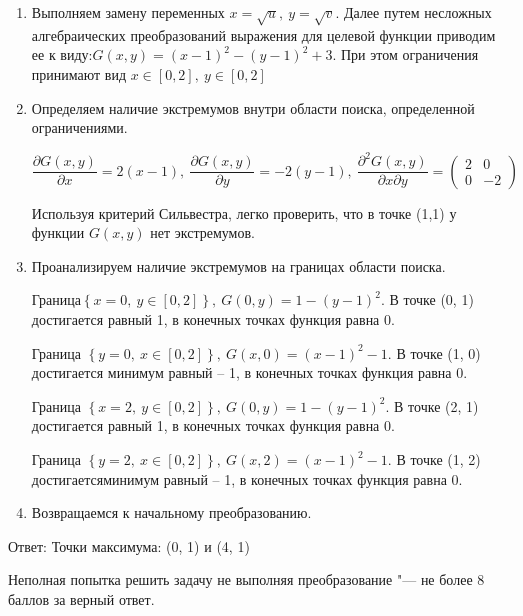 \documentclass[addpoints, answers]{exam} %
\begin{document}
\begin{questions}
\begin{solution}
  \begin{enumerate}
  \item  Выполняем замену переменных $x=\sqrt{u},\ y=\sqrt{v}$. Далее путем несложных алгебраических преобразований выражения для целевой функции приводим ее к виду:$G\left(x,y\right)={\left(x-1\right)}^2-{\left(y-1\right)}^2+3$. При этом ограничения принимают вид $x\in \left[0,2\right],\ y\in \left[0,2\right]$

  \item  Определяем наличие экстремумов внутри области поиска, определенной ограничениями.

  \[\frac{\partial G\left(x,y\right)}{\partial x}=2\left(x-1\right),\ \frac{\partial G\left(x,y\right)}{\partial y}=-2\left(y-1\right),\ \frac{{\partial }^2G\left(x,y\right)}{\partial x\partial y}=\left( \begin{array}{cc}
  2 & 0 \\
  0 & -2 \end{array}
  \right)\]


Используя критерий Сильвестра, легко проверить, что в точке (1,1) у функции $G(x,y)$ нет экстремумов.

\item  Проанализируем наличие экстремумов на границах области поиска.

Граница$\left\{x=0,\ y\in \left[0,2\right]\right\},\ G\left(0,y\right)=1-{\left(y-1\right)}^2$. В точке (0, 1) достигается \textbf{} равный 1, в конечных точках функция равна 0.

Граница $\left\{y=0,\ x\in \left[0,2\right]\right\},\ G\left(x,0\right)={\left(x-1\right)}^2-1$. В точке (1, 0) достигается минимум равный -- 1, в конечных точках функция равна 0.

Граница $\left\{x=2,\ y\in \left[0,2\right]\right\},\ G\left(0,y\right)=1-{\left(y-1\right)}^2$. В точке (2, 1) достигается \textbf{} равный 1, в конечных точках функция равна 0.

Граница $\left\{y=2,\ x\in \left[0,2\right]\right\},\ G\left(x,2\right)={\left(x-1\right)}^2-1$. В точке (1, 2) достигаетсяминимум равный -- 1, в конечных точках функция равна 0.

\item  Возвращаемся к начальному преобразованию.
\end{enumerate}

Ответ: Точки максимума: (0, 1) и (4, 1)

Неполная попытка решить задачу не выполняя преобразование "--- не более 8 баллов за верный ответ.


\end{solution}
\end{questions}
\end{document}
